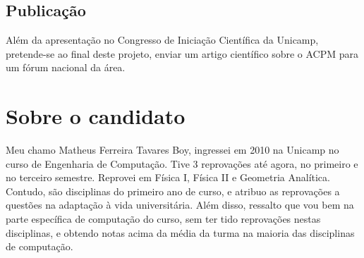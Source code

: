\documentclass[10pt,a4paper]{article}
\begin{document}
\subsection{Publicação}
Além da apresentação no Congresso de Iniciação Científica da Unicamp,
pretende-se ao final deste projeto, enviar um artigo científico sobre
o ACPM para um fórum nacional da área.
        
\section{Sobre o candidato}
Meu chamo Matheus Ferreira Tavares Boy, ingressei em 2010 na Unicamp
no curso de Engenharia de Computação. Tive 3 reprovações até agora, no
primeiro e no terceiro semestre. Reprovei em Física I, Física II e
Geometria Analítica. Contudo, são disciplinas do primeiro ano de
curso, e atribuo as reprovações a questões na adaptação à vida
universitária. Além disso, ressalto que vou bem na parte específica de
computação do curso, sem ter tido reprovações nestas disciplinas, e
obtendo notas acima da média da turma na maioria das disciplinas de
computação.




\end{document}
